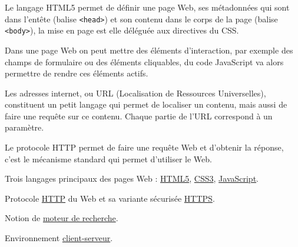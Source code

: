 \begin{jazzitemize}
\item Le langage HTML5  permet de définir une page Web, ses métadonnées qui sont dans l'entête (balise \texttt{<head>}) et son contenu dans le corps de la page (balise \texttt{<body>}),  la mise en page est elle déléguée aux directives du CSS.
\item Dans une page Web on peut mettre des éléments d'interaction, par exemple des champs de formulaire ou des éléments cliquables, du code JavaScript va alors permettre de rendre ces éléments actifs.
\item Les adresses internet, ou URL (Localisation de Ressources Universelles), constituent un petit langage qui permet de localiser un conte\-nu,  mais aussi de faire une requête sur ce contenu.  Chaque partie de l'URL correspond à un paramètre.
\item Le protocole HTTP  permet de faire une requête Web et d'obtenir la réponse, c'est le mécanisme standard qui permet d'utiliser le Web.
\end{jazzitemize}


\begin{jazzitemize}
\item Trois langages principaux des pages Web : \href{https://fr.wikipedia.org/wiki/HTML5}{HTML5}, \href{https://fr.wikipedia.org/wiki/Feuilles_de_style_en_cascade\#CSS3}{CSS3}, \href{https://fr.wikipedia.org/wiki/JavaScript}{JavaScript}.
\item Protocole \href{https://fr.wikipedia.org/wiki/Hypertext_Transfer_Protocol}{HTTP} du Web et sa variante sécurisée \href{https://fr.wikipedia.org/wiki/HyperText_Transfer_Protocol_Secure}{HTTPS}.
\item Notion de \href{https://fr.wikipedia.org/wiki/Moteur_de_recherche}{moteur de recherche}.
\item Environnement \href{https://fr.wikipedia.org/wiki/Client-serveur}{client-serveur}.
\end{jazzitemize}


